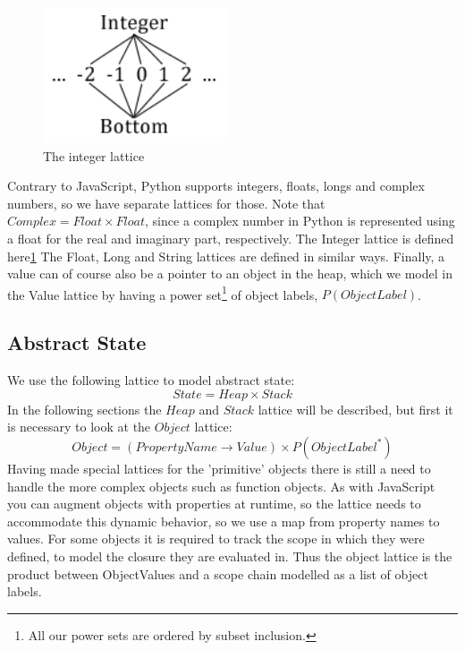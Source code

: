 \begin{figure}
	\vspace{-20pt}
	\begin{center}
		\includegraphics[width=0.48\textwidth]{images/integer-lattice.png}
	\end{center}
	\vspace{-10pt}
	\caption{The integer lattice}
	\label{fig:latticeInteger}
	\vspace{-10pt}
\end{figure}
Contrary to JavaScript, Python supports integers, floats, longs and complex numbers, so we have separate lattices for those. Note that $Complex = Float \times Float$, since a complex number in Python is represented using a float for the real and imaginary part, respectively\cite{pyref.stdtypes}. The Integer lattice is defined here\ref{fig:latticeInteger}
The Float, Long and String lattices are defined in similar ways. Finally, a value can of course also be a pointer to an object in the heap, which we model in the Value lattice by having a power set\footnote{All our power sets are ordered by subset inclusion.} of object labels, $P(ObjectLabel)$.

\subsection{Abstract State}
We use the following lattice to model abstract state:
\begin{equation*}
State = Heap \times Stack
\end{equation*}
In the following sections the $Heap$ and $Stack$ lattice will be described, but first it is necessary to look at the $Object$ lattice:
\begin{equation*}
Object = (PropertyName \rightarrow Value) \times P(ObjectLabel^{*})
\end{equation*}
Having made special lattices for the 'primitive' objects there is still a need to handle the more complex objects such as function objects.
As with JavaScript you can augment objects with properties at runtime, so the lattice needs to accommodate this dynamic behavior, so
we use a map from property names to values. For some objects it is required to track the scope in which they were defined, to model the closure they are evaluated in.
Thus the object lattice is the product between ObjectValues and a scope chain modelled as a list of object labels.
